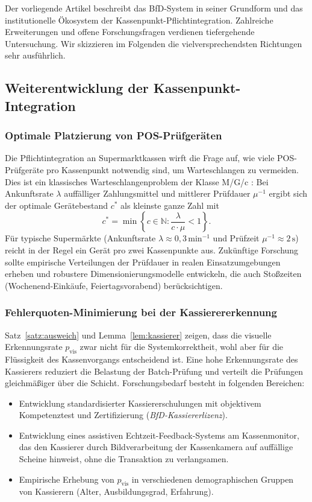 ﻿\documentclass[a4paper,12pt]{article}
\theoremstyle{definition}
\begin{document}
Der vorliegende Artikel beschreibt das BfD-System in seiner Grundform
und das institutionelle Ökosystem der Kassenpunkt-Pflichtintegration.
Zahlreiche Erweiterungen und offene Forschungsfragen verdienen tiefergehende
Untersuchung.  Wir skizzieren im Folgenden die vielversprechendsten Richtungen
sehr ausführlich.

\subsection{Weiterentwicklung der Kassenpunkt-Integration}

\subsubsection{Optimale Platzierung von POS-Prüfgeräten}

Die Pflichtintegration an Supermarktkassen wirft die Frage auf,
wie viele POS-Prüfgeräte pro Kassenpunkt notwendig sind, um
Warteschlangen zu vermeiden.  Dies ist ein klassisches Warteschlangenproblem
der Klasse M/G/c \cite{kleinrock1975}: Bei Ankunftsrate $\lambda$ auffälliger
Zahlungsmittel und mittlerer Prüfdauer $\mu^{-1}$ ergibt sich der optimale
Gerätebestand $c^*$ als kleinste ganze Zahl mit
\[
c^* = \min \left\{ c \in \mathbb{N} : \frac{\lambda}{c \cdot \mu} < 1 \right\}.
\]
Für typische Supermärkte (Ankunftsrate $\lambda \approx 0{,}3\,\text{min}^{-1}$
und Prüfzeit $\mu^{-1} \approx 2\,\text{s}$) reicht in der Regel ein Gerät pro
zwei Kassenpunkte aus.  Zukünftige Forschung sollte empirische Verteilungen
der Prüfdauer in realen Einsatzumgebungen erheben und robustere
Dimensionierungsmodelle entwickeln, die auch Stoßzeiten (Wochenend-Einkäufe,
Feiertagsvorabend) berücksichtigen.

\subsubsection{Fehlerquoten-Minimierung bei der Kassierererkennung}

Satz~\ref{satz:ausweich} und Lemma~\ref{lem:kassierer} zeigen,
dass die visuelle Erkennungsrate $p_{\text{vis}}$ zwar nicht für die
Systemkorrektheit, wohl aber für die Flüssigkeit des Kassenvorgangs entscheidend ist.
Eine hohe Erkennungsrate des Kassierers reduziert die Belastung der Batch-Prüfung
und verteilt die Prüfungen gleichmäßiger über die Schicht.
Forschungsbedarf besteht in folgenden Bereichen:
\begin{itemize}
  \item Entwicklung standardisierter Kassiererschulungen mit objektivem
        Kompetenztest und Zertifizierung (\emph{BfD-Kassiererlizenz}).
  \item Entwicklung eines assistiven Echtzeit-Feedback-Systems am Kassenmonitor,
        das den Kassierer durch Bildverarbeitung der Kassenkamera auf
        auffällige Scheine hinweist, ohne die Transaktion zu verlangsamen.
  \item Empirische Erhebung von $p_{\text{vis}}$ in verschiedenen demographischen
        Gruppen von Kassierern (Alter, Ausbildungsgrad, Erfahrung).
\end{itemize}
\end{document}
